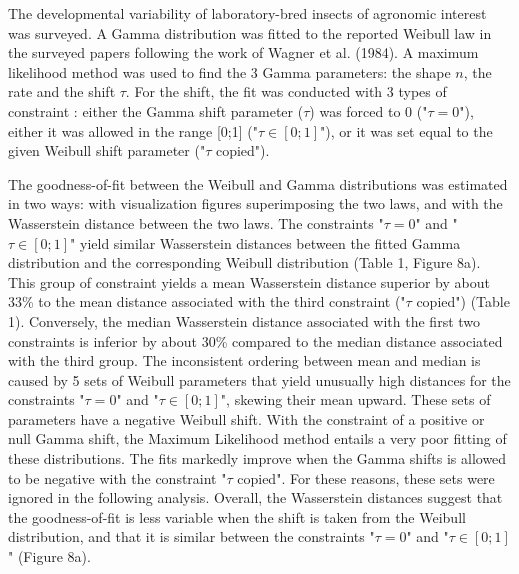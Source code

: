 \documentclass[12pt,a4paper,onecolumn]{article}
\begin{document}
\tabto{1 cm} The developmental variability of laboratory-bred insects of agronomic interest was surveyed. A Gamma distribution was fitted to the reported Weibull law in the surveyed papers following the work of Wagner et al. (1984). A maximum likelihood method was used to find the 3 Gamma parameters: the shape $n$, the rate and the shift $\tau$. For the shift, the fit was conducted with 3 types of constraint : either the Gamma shift parameter ($\tau$) was forced to 0 ("$\tau = 0$"), either it was allowed in the range [0;1] ("$\tau \in [0;1]$"), or it was set equal to the given Weibull shift parameter ("$\tau$ copied"). 

\tabto{1 cm} The goodness-of-fit between the Weibull and Gamma distributions was estimated in two ways: with visualization figures superimposing the two laws, and with the Wasserstein distance between the two laws. The constraints "$\tau = 0$" and "$\tau \in [0;1]$" yield similar Wasserstein distances between the fitted Gamma distribution and the corresponding Weibull distribution (Table 1, Figure 8a). This group of constraint yields a mean Wasserstein distance superior by about 33\% to the mean distance associated with the third constraint ("$\tau$ copied") (Table 1). Conversely, the median Wasserstein distance associated with the first two constraints is inferior by about 30\% compared to the median distance associated with the third group. The inconsistent ordering between mean and median is caused by 5 sets of Weibull parameters that yield unusually high distances for the constraints "$\tau = 0$" and "$\tau \in [0;1]$", skewing their mean upward. These sets of parameters have a negative Weibull shift. With the constraint of a positive or null Gamma shift, the Maximum Likelihood method entails a very poor fitting of these distributions. The fits markedly improve when the Gamma shifts is allowed to be negative with the constraint "$\tau$ copied". For these reasons, these sets were ignored in the following analysis. Overall, the Wasserstein distances suggest that the goodness-of-fit is less variable when the shift is taken from the Weibull distribution, and that it is similar between the constraints "$\tau = 0$" and "$\tau \in [0;1]$" (Figure 8a). 
\end{document}
